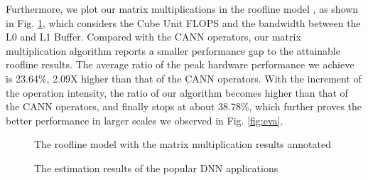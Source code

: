Furthermore, we plot our matrix multiplications in the roofline model \cite{DBLP:journals/cacm/WilliamsWP09}, as shown in Fig. \ref{fig:roofline}, which considers the Cube Unit FLOPS and the bandwidth between the L0 and L1 Buffer. Compared with the CANN operators, our matrix multiplication algorithm reports a smaller performance gap to the attainable roofline results. The average ratio of the peak hardware performance we achieve is 23.64\%, 2.09X higher than that of the CANN operators. With the increment of the operation intensity, the ratio of our algorithm becomes higher than that of the CANN operators, and finally stops at about 38.78\%, which further proves the better performance in larger scales we observed in Fig. \ref{fig:eva}.

\begin{figure}[tbp]
    \caption{The roofline model with the matrix multiplication results annotated}
    \label{fig:roofline}
    \end{figure}

\begin{figure}[tbp]
    \caption{The estimation results of the popular DNN applications}
    \label{fig:app_acc}
    \end{figure}
        
